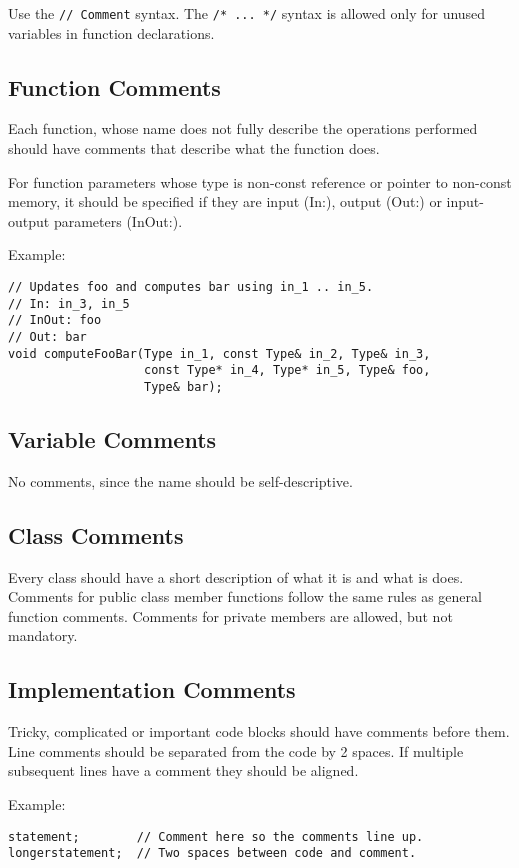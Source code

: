 \documentclass[a4paper]{article}
\newcommand{\inlinecode}[1]{\lstinline|#1|}
\begin{document}
Use the \inlinecode{// Comment} syntax. The \inlinecode{/* ... */} syntax is allowed only for unused variables in function declarations.

\subsection{Function Comments}

Each function, whose name does not fully describe the operations performed should have comments that describe what the function does.

For function parameters whose type is non-const reference or pointer to non-const memory,
it should be specified if they are input (In:), output (Out:) or input-output parameters (InOut:).

Example:
\begin{lstlisting}
// Updates foo and computes bar using in_1 .. in_5.
// In: in_3, in_5
// InOut: foo
// Out: bar
void computeFooBar(Type in_1, const Type& in_2, Type& in_3,
                   const Type* in_4, Type* in_5, Type& foo,
                   Type& bar);
\end{lstlisting}

\subsection{Variable Comments}

No comments, since the name should be self-descriptive.

\subsection{Class Comments}

Every class should have a short description of what it is and what is does.
Comments for public class member functions follow the same rules as general function comments.
Comments for private members are allowed, but not mandatory.

\subsection{Implementation Comments}

Tricky, complicated or important code blocks should have comments before them.
Line comments should be separated from the code by 2 spaces. If multiple subsequent lines have a comment they should be aligned.

Example:
\begin{lstlisting}
statement;        // Comment here so the comments line up.
longerstatement;  // Two spaces between code and comment.
\end{lstlisting}
\end{document}
